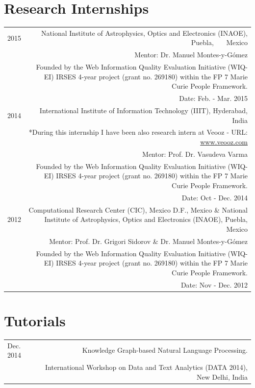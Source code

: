 \documentclass[10pt]{article}
\begin{document}
\section*{Research Internships}
\begin{tabular}{L!{\VRule}R}
2015&National Institute of Astrophysics, Optics and Electronics (INAOE), Puebla, ~~~Mexico\\
&\scriptsize{Mentor: Dr. Manuel Montes-y-G{\'o}mez}\\          
&\scriptsize{Founded by the  Web Information Quality Evaluation Initiative (WIQ-EI) IRSES 4-year project (grant no. 269180) within the FP 7 Marie Curie People Framework.}\\
&\scriptsize{Date: Feb. - Mar. 2015}\vspace{5pt}\\
2014&International Institute of Information Technology (IIIT), Hyderabad, India\\
&\scriptsize{*During this internship I have been also research intern at Veooz - URL: \url{www.veooz.com} }\\
&\scriptsize{Mentor: Prof. Dr. Vasudeva Varma}\\          
&\scriptsize{Founded by the  Web Information Quality Evaluation Initiative (WIQ-EI) IRSES 4-year project (grant no. 269180) within the FP 7 Marie Curie People Framework.}\\
&\scriptsize{Date: Oct - Dec. 2014}\vspace{5pt}\\
2012&Computational Research Center (CIC), Mexico D.F., Mexico \& National Institute of Astrophysics, Optics and Electronics (INAOE), Puebla, Mexico\\
&\scriptsize{Mentor: Prof. Dr. Grigori Sidorov \& Dr. Manuel Montes-y-G{\'o}mez}\\          
&\scriptsize{Founded by the  Web Information Quality Evaluation Initiative (WIQ-EI) IRSES 4-year project (grant no. 269180) within the FP 7 Marie Curie People Framework.}\\
&\scriptsize{Date: Nov - Dec. 2012}\vspace{5pt}\\
\end{tabular}

\section*{Tutorials}
\begin{tabular}{L!{\VRule}R}
Dec. 2014&Knowledge Graph-based Natural Language Processing.\\
&\scriptsize{International Workshop on Data and Text Analytics (DATA 2014), New Delhi, India} \vspace{5pt}\\
\end{tabular}
\end{document}
